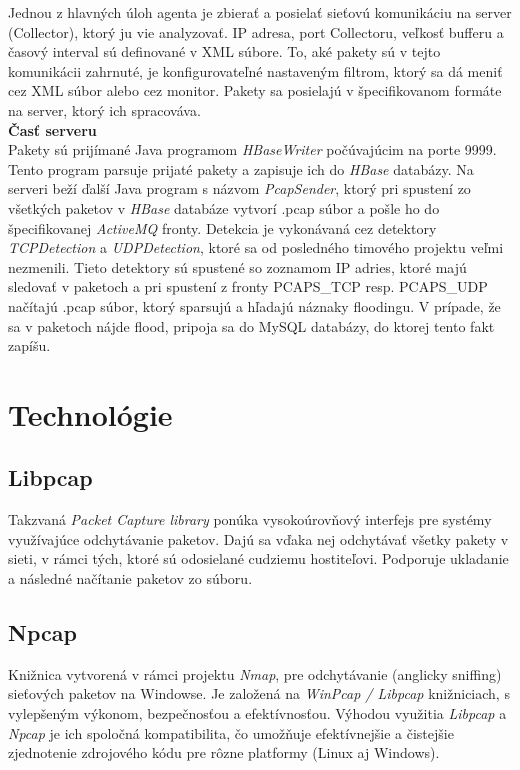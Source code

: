 \documentclass[a4paper,12pt]{article}
\begin{document}
Jednou z hlavných úloh agenta je zbierať a posielať sieťovú komunikáciu na server (Collector), ktorý ju vie analyzovať. IP adresa, port Collectoru, veľkosť bufferu a časový interval sú definované v XML súbore. To, aké pakety sú v tejto komunikácii zahrnuté, je konfigurovateľné nastaveným filtrom, ktorý sa dá meniť cez XML súbor alebo cez monitor. Pakety sa posielajú v špecifikovanom formáte na server, ktorý ich spracováva. \\

\noindent \textbf{Časť serveru} \\

Pakety sú prijímané Java programom \textit{HBaseWriter} počúvajúcim na porte 9999. Tento program parsuje prijaté pakety a zapisuje ich do \textit{HBase} databázy.  Na serveri beží ďalší Java program s názvom \textit{PcapSender}, ktorý pri spustení zo všetkých paketov v \textit{HBase} databáze vytvorí .pcap súbor a pošle ho do špecifikovanej \textit{ActiveMQ} fronty. Detekcia je vykonávaná cez detektory \textit{TCPDetection} a \textit{UDPDetection}, ktoré sa od posledného timového projektu veľmi nezmenili. Tieto detektory sú spustené so zoznamom IP adries, ktoré majú sledovať v paketoch a pri spustení z fronty PCAPS\_TCP resp. PCAPS\_UDP načítajú .pcap súbor, ktorý sparsujú a hľadajú náznaky floodingu. V prípade, že sa v paketoch nájde flood, pripoja sa do MySQL databázy, do ktorej tento fakt zapíšu. \\
\newpage

\section{Technológie}
\subsection{Libpcap}

Takzvaná \textit{Packet Capture library} ponúka vysokoúrovňový interfejs pre systémy využívajúce odchytávanie paketov. Dajú sa vďaka nej odchytávať všetky pakety v sieti, v rámci tých, ktoré sú odosielané cudziemu hostiteľovi. Podporuje ukladanie a následné načítanie paketov zo súboru.

\subsection{Npcap}

Knižnica vytvorená v rámci projektu \textit{Nmap}, pre odchytávanie (anglicky sniffing) sieťových paketov na Windowse. Je založená na \textit{WinPcap / Libpcap} knižniciach, s vylepšeným výkonom, bezpečnosťou a efektívnosťou. Výhodou využitia \textit{Libpcap} a \textit{Npcap} je ich spoločná kompatibilita, čo umožňuje efektívnejšie a čistejšie zjednotenie zdrojového kódu pre rôzne platformy (Linux aj Windows).
\end{document}
